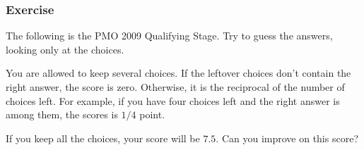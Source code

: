 \documentclass[10pt,paper=letter]{scrartcl}
\begin{document}
\pagestyle{plain}
\vspace{-3em}

\subsubsection*{Exercise}

The following is the PMO 2009 Qualifying Stage. Try to guess the answers, looking only at the choices.

You are allowed to keep several choices. If the leftover choices don't contain the right answer, the score is zero. Otherwise, it is the reciprocal of the number of choices left. For example, if you have four choices left and the right answer is among them, the scores is $1/4$ point.

If you keep all the choices, your score will be $7.5$. Can you improve on this score?
\end{document}
